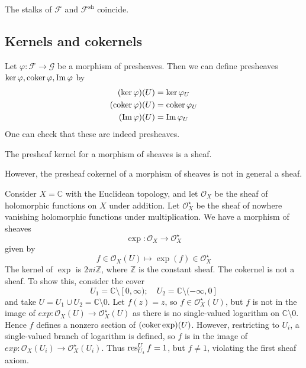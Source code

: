 \begin{corollary}
    The stalks of \( \mathcal F \) and \( \mathcal F^{\mathrm{sh}} \) coincide.
\end{corollary}

\subsection{Kernels and cokernels}
Let \( \varphi : \mathcal F \to \mathcal G \) be a morphism of presheaves.
Then we can define presheaves \( \ker \varphi, \operatorname{coker} \varphi, \operatorname{Im} \varphi \) by
\begin{align*}
    (\ker \varphi)(U) &= \ker \varphi_U \\
    (\operatorname{coker} \varphi)(U) &= \operatorname{coker} \varphi_U \\
    (\operatorname{Im} \varphi)(U) &= \operatorname{Im} \varphi_U
\end{align*}
One can check that these are indeed presheaves.
\begin{proposition}
    The presheaf kernel for a morphism of sheaves is a sheaf.
\end{proposition}
However, the presheaf cokernel of a morphism of sheaves is not in general a sheaf.
\begin{example}
    Consider \( X = \mathbb C \) with the Euclidean topology, and let \( \mathcal O_X \) be the sheaf of holomorphic functions on \( X \) under addition.
    Let \( \mathcal O_X^\star \) be the sheaf of nowhere vanishing holomorphic functions under multiplication.
    We have a morphism of sheaves
    \[ \exp : \mathcal O_X \to \mathcal O_X^\star \]
    given by
    \[ f \in \mathcal O_X(U) \mapsto \exp(f) \in \mathcal O_X^\star \]
    The kernel of \( \exp \) is \( 2\pi i \mathbb Z \), where \( \mathbb Z \) is the constant sheaf.
    The cokernel is not a sheaf.
    To show this, consider the cover
    \[ U_1 = \mathbb C \setminus [0, \infty);\quad U_2 = \mathbb C \setminus (-\infty, 0] \]
    and take \( U = U_1 \cup U_2 = \mathbb C \setminus \qty{0} \).
    Let \( f(z) = z \), so \( f \in \mathcal O_X^\star(U) \), but \( f \) is not in the image of \( exp : \mathcal O_X(U) \to \mathcal O_X^\star(U) \) as there is no single-valued logarithm on \( \mathbb C \setminus \qty{0} \).
    Hence \( f \) defines a nonzero section of \( (\operatorname{coker} \exp)(U) \).
    However, restricting to \( U_i \), a single-valued branch of logarithm is defined, so \( f \) is in the image of \( exp : \mathcal O_X(U_i) \to \mathcal O_X^\star(U_i) \).
    Thus \( \operatorname{res}_{U_i}^U f = 1 \), but \( f \neq 1 \), violating the first sheaf axiom.
\end{example}
